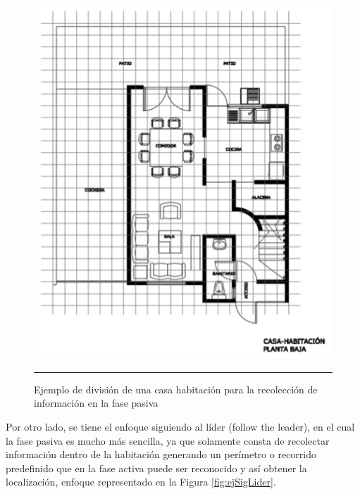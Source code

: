 \begin{figure}[htbp]
	\centering
		\includegraphics{Figuras/ejPasiva.png}
		\rule{35em}{0.5pt}
	\caption[División de una casa habitación para la recolección de información en la fase pasiva]{Ejemplo de división de una casa habitación para la recolección de información en la fase pasiva}
	\label{fig:ejPasiva}
\end{figure}

Por otro lado, se tiene el enfoque siguiendo al líder (follow the leader), en el cual la fase pasiva es mucho más sencilla, ya que solamente consta de recolectar información dentro de la habitación generando un perímetro o recorrido predefinido que en la fase activa puede ser reconocido y así obtener la localización, enfoque representado en la Figura \ref{fig:ejSigLider}.

